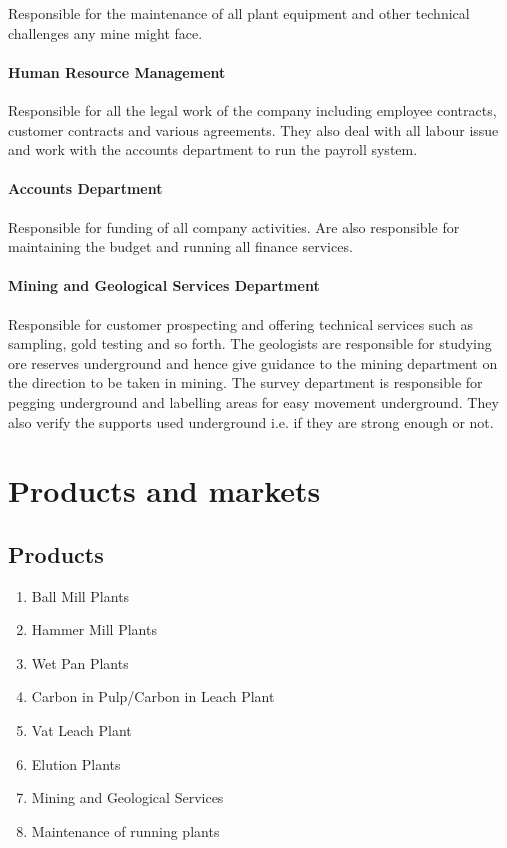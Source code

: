 \noindent Responsible for the maintenance of all plant equipment and other technical challenges any mine might face. 


\paragraph{ Human Resource Management}

\noindent Responsible for all the legal work of the company including employee contracts, customer contracts and various agreements. They also deal with all labour issue and work with the accounts department to run the payroll system. 


\paragraph{ Accounts Department}

\noindent Responsible for funding of all company activities. Are also responsible for maintaining the budget and running all finance services. 


\paragraph{ Mining and Geological Services Department}

\noindent Responsible for customer prospecting and offering technical services such as sampling, gold testing and so forth. The geologists are responsible for studying ore reserves underground and hence give guidance to the mining department on the direction to be taken in mining. The survey department is responsible for pegging underground and labelling areas for easy movement underground. They also verify the supports used underground i.e. if they are strong enough or not.


\section{ Products and markets}


\subsection{ Products}

\begin{enumerate}
\item \textbf{ }Ball Mill Plants

\item  Hammer Mill Plants

\item  Wet Pan Plants

\item  Carbon in Pulp/Carbon in Leach Plant

\item  Vat Leach Plant

\item  Elution Plants

\item  Mining and Geological Services

\item  Maintenance of running plants
\end{enumerate}


